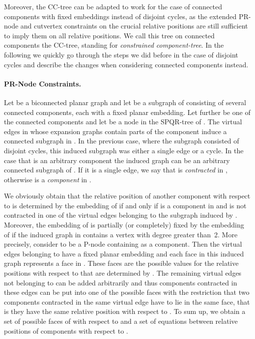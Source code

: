\documentclass{scrartcl}
\newcommand{\1}[1]{{\normalfont \ensuremath{#1^{\tiny\circled{1}}}}} \newcommand{\2}[1]{{\normalfont \ensuremath{#1^{\tiny\circled{2}}}}} \renewcommand{\k}[1]{{\normalfont \ensuremath{#1^{\tiny\circled{k}}}}} \newcommand{\proj}[2]{\ensuremath{\left.#1\right|_{#2}}} \newcommand{\eps}{\varepsilon}
\theoremstyle{plain} \newtheorem{theorem}{Theorem} \newcounter{lemmacounter} \setcounter{lemmacounter}{0} \newtheorem{lemma}[lemmacounter]{Lemma} \newtheorem{fact}{Fact}  \newtheorem{corollary}{Corollary} \theoremstyle{definition} \newtheorem{definition}{Definition}
\begin{document}
Moreover, the CC-tree can be adapted to work for the case of connected
components with fixed embeddings instead of disjoint cycles, as the
extended PR-node and cutvertex constraints on the crucial relative
positions are still sufficient to imply them on all relative
positions.  We call this tree on connected components the
CC-tree, standing for \emph{constrained component-tree}.  In
the following we quickly go through the steps we did before in the
case of disjoint cycles and describe the changes when considering
connected components instead.

\paragraph{PR-Node Constraints.}
\label{sec:pr-node-constraints}

Let  be a biconnected planar graph and let  be a
subgraph of  consisting of several connected components, each with
a fixed planar embedding.  Let further  be one of
the connected components and let  be a node in the SPQR-tree
 of .  The virtual edges in  whose
expansion graphs contain parts of the component  induce a connected
subgraph in .  In the previous case, where the subgraph
consisted of disjoint cycles, this induced subgraph was either a
single edge or a cycle.  In the case that  is an arbitrary
component the induced graph can be an arbitrary connected subgraph of
.  If it is a single edge, we say that  is
\emph{contracted} in , otherwise  is a \emph{component} in
.

We obviously obtain that the relative position  of another
component  with respect to  is determined by the embedding of
 if and only if  is a component in  and  is
not contracted in one of the virtual edges belonging to the subgraph
induced by .  Moreover, the embedding of  is partially
(or completely) fixed by the embedding of  if the induced graph in
 contains a vertex with degree greater than~2.  More
precisely, consider  to be a P-node containing  as a
component.  Then the virtual edges belonging to  have a fixed
planar embedding and each face in this induced graph represents a face
in .  These faces are the possible values for the relative
positions with respect to  that are determined by .  The
remaining virtual edges not belonging to  can be added arbitrarily
and thus components contracted in these edges can be put into one of
the possible faces with the restriction that two components contracted
in the same virtual edge have to lie in the same face, that is they
have the same relative position with respect to .  To sum up, we
obtain a set of possible faces of  with respect to  and a set
of equations between relative positions of components with respect to
.
\end{document}
